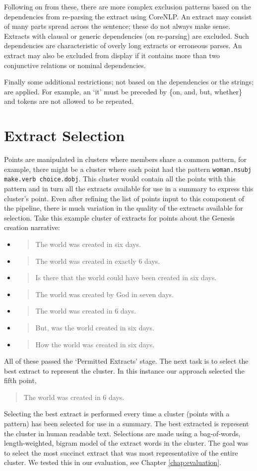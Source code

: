     Following on from these, there are more complex exclusion patterns based on the dependencies from re-parsing the extract using CoreNLP. An extract may consist of many parts spread across the sentence; these do not always make sense. Extracts with clausal or generic dependencies (on re-parsing) are excluded. Such dependencies are characteristic of overly long extracts or erroneous parses. An extract may also be excluded from display if it contains more than two conjunctive relations or nominal dependencies.

    Finally some additional restrictions; not based on the dependencies or the strings; are applied. For example, an `it' must be preceded by \{on, and, but, whether\} and tokens are not allowed to be repeated.

  \section{Extract Selection}
    Points are manipulated in clusters where members share a common pattern, for example, there might be a cluster where each point had the pattern \texttt{woman.nsubj make.verb choice.dobj}. This cluster would contain all the points with this pattern and in turn all the extracts available for use in a summary to express this cluster's point. Even after refining the list of points input to this component of the pipeline, there is much variation in the quality of the extracts available for selection. Take this example cluster of extracts for points about the Genesis creation narrative:

    \begin{itemize}[label={}]
      \item{\blockquote{The world was created in six days.}}
      \item{\blockquote{The world was created in exactly 6 days.}}
      \item{\blockquote{Is there that the world could have been created in six days.}}
      \item{\blockquote{The world was created by God in seven days.}}
      \item{\blockquote{The world was created in 6 days.}}
      \item{\blockquote{But, was the world created in six days.}}
      \item{\blockquote{How the world was created in six days.}}
    \end{itemize}

    All of these passed the `Permitted Extracts' stage. The next task is to select the best extract to represent the cluster. In this instance our approach selected the fifth point, \blockquote{The world was created in 6 days.}. Selecting the best extract is performed every time a cluster (points with a pattern) has been selected for use in a summary. The best extracted is represent the cluster in human readable text. Selections are made using a bag-of-words, length-weighted, bigram model of the extract words in the cluster. The goal was to select the most succinct extract that was most representative of the entire cluster. We tested this in our evaluation, see Chapter \ref{chap:evaluation}.


